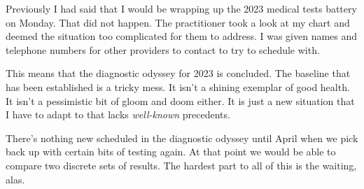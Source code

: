 Previously I had said that I would be wrapping up the 2023 medical tests
battery on Monday. That did not happen. The practitioner took a look at
my chart and deemed the situation too complicated for them to address. I
was given names and telephone numbers for other providers to contact to
try to schedule with.

This means that the diagnostic odyssey for 2023 is concluded. The
baseline that has been established is a tricky mess. It isn't a shining
exemplar of good health. It isn't a pessimistic bit of gloom and doom
either. It is just a new situation that I have to adapt to that lacks
\emph{well-known} precedents.

There's nothing new scheduled in the diagnostic odyssey until April when
we pick back up with certain bits of testing again. At that point we
would be able to compare two discrete sets of results. The hardest part
to all of this is the waiting, alas.
